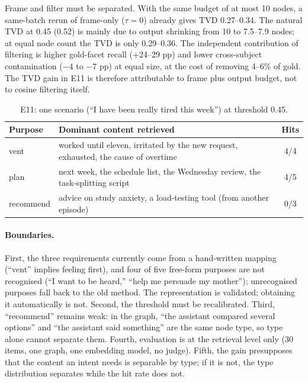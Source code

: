 \documentclass[11pt]{article}
\begin{document}
Frame and filter must be separated. With the same budget of at most 10 nodes, a same-batch rerun
of frame-only ($\tau=0$) already gives TVD 0.27--0.34. The natural TVD at 0.45 (0.52) is mainly
due to output shrinking from 10 to 7.5--7.9 nodes; at equal node count the TVD is only 0.29--0.36. The
independent contribution of filtering is higher gold-facet recall (+24--29 pp) and lower
cross-subject contamination ($-4$ to $-7$ pp) at equal size, at the cost of removing 4--6\% of
gold. The TVD gain in E11 is therefore attributable to frame plus output budget, not to cosine
filtering itself.

\begin{table}[t]
  \centering
  \small
  \begin{tabular}{@{}llc@{}}
    \toprule
    Purpose & Dominant content retrieved & Hits \\
    \midrule
    vent & worked until eleven, irritated by the new request, exhausted, the cause of overtime
         & 4/4 \\
    plan & next week, the schedule list, the Wednesday review, the task-splitting script
         & 4/5 \\
    recommend & advice on study anxiety, a load-testing tool (from another episode) & 0/3 \\
    \bottomrule
  \end{tabular}
  \caption{E11: one scenario (``I have been really tired this week'') at threshold 0.45.}
  \label{tab:e11example}
\end{table}

\paragraph{Boundaries.}
First, the three requirements currently come from a hand-written mapping (``vent'' implies
feeling first), and four of five free-form purposes are not recognised (``I want to be heard,''
``help me persuade my mother''); unrecognised purposes fall back to the old method. The
representation is validated; obtaining it automatically is not. Second, the threshold must be
recalibrated. Third, ``recommend'' remains weak: in the graph, ``the assistant compared several
options'' and ``the assistant said something'' are the same node type, so type alone cannot
separate them. Fourth, evaluation is at the retrieval level only (30 items, one graph, one
embedding model, no judge). Fifth, the gain presupposes that the content an intent needs is
separable by type; if it is not, the type distribution separates while the hit rate does not.
\end{document}

